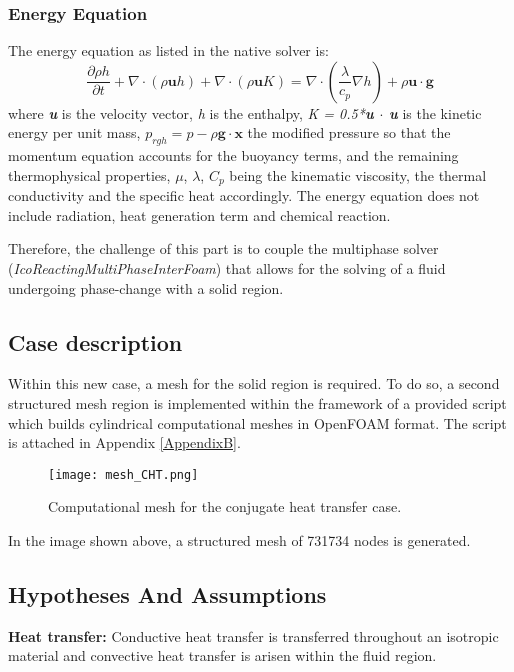 \subsubsection*{Energy Equation}
The energy equation as listed in the native solver is:
\begin{equation}
	\frac{\partial \rho h}{\partial t}+\nabla \cdot(\rho \boldsymbol{u} h)+\nabla \cdot(\rho \boldsymbol{u} K)=\nabla \cdot\left(\frac{\lambda}{c_{p}} \nabla h\right)+\rho \boldsymbol{u} \cdot \boldsymbol{g}
	\label{4.3}
\end{equation}
where \textit{\textbf{u}} is the velocity vector, \textit{h} is the enthalpy, \textit{K = 0.5*\textbf{u $\cdot$ u}} is the kinetic energy per unit mass, \textit{$p_{rgh}=p-\rho\textbf{g}\cdot\textbf{x}$} the modified pressure so that the momentum equation accounts for the buoyancy terms, and the remaining thermophysical properties, $\mu$, $\lambda$, $C_p$ being the kinematic viscosity, the thermal conductivity and the specific heat accordingly. The energy equation does not include radiation, heat generation term and chemical reaction.

\noindent Therefore, the challenge of this part is to couple the multiphase solver (\textit{IcoReactingMultiPhaseInterFoam}) that allows for the solving of a fluid undergoing phase-change with a solid region.  
\subsection{Case description}

\setlength{\parindent}{0.5cm} Within this new case, a mesh for the solid region is required. To do so, a second structured mesh region is implemented within the framework of a provided script which builds cylindrical computational meshes in OpenFOAM format. The script is attached in Appendix \ref{AppendixB}.
\begin{figure}[h!]
	\centering
	\texttt{[image: mesh\_CHT.png]}	
	\label{4.1fig}
	\caption{Computational mesh for the conjugate heat transfer case.}
\end{figure} 
\newline
In the image shown above, a structured mesh of 731734 nodes is generated.
\subsection{Hypotheses And Assumptions}
\textbf{Heat transfer:} Conductive heat transfer is transferred throughout an isotropic material and convective heat transfer is arisen within the fluid region. 

